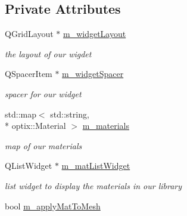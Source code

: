 \subsection*{Private Attributes}
\begin{DoxyCompactItemize}
\item 
\hypertarget{class_material_library_acc7cbee72728cb17b9dc46c6eb181235}{Q\-Grid\-Layout $\ast$ \hyperlink{class_material_library_acc7cbee72728cb17b9dc46c6eb181235}{m\-\_\-widget\-Layout}}\label{class_material_library_acc7cbee72728cb17b9dc46c6eb181235}

\begin{DoxyCompactList}\small\item\em the layout of our wigdet \end{DoxyCompactList}\item 
\hypertarget{class_material_library_a68a1b4d7a9cae065772845db125fee27}{Q\-Spacer\-Item $\ast$ \hyperlink{class_material_library_a68a1b4d7a9cae065772845db125fee27}{m\-\_\-widget\-Spacer}}\label{class_material_library_a68a1b4d7a9cae065772845db125fee27}

\begin{DoxyCompactList}\small\item\em spacer for our widget \end{DoxyCompactList}\item 
\hypertarget{class_material_library_af25abb43cda644364bc7faefbd957f9d}{std\-::map$<$ std\-::string, \\*
optix\-::\-Material $>$ \hyperlink{class_material_library_af25abb43cda644364bc7faefbd957f9d}{m\-\_\-materials}}\label{class_material_library_af25abb43cda644364bc7faefbd957f9d}

\begin{DoxyCompactList}\small\item\em map of our materials \end{DoxyCompactList}\item 
\hypertarget{class_material_library_a6a4c3021bf23b7048bbb5ef82c66d9dd}{Q\-List\-Widget $\ast$ \hyperlink{class_material_library_a6a4c3021bf23b7048bbb5ef82c66d9dd}{m\-\_\-mat\-List\-Widget}}\label{class_material_library_a6a4c3021bf23b7048bbb5ef82c66d9dd}

\begin{DoxyCompactList}\small\item\em list widget to display the materials in our library \end{DoxyCompactList}\item 
\hypertarget{class_material_library_ab1dded7ae6d88f5407e29af6f68caf4a}{bool \hyperlink{class_material_library_ab1dded7ae6d88f5407e29af6f68caf4a}{m\-\_\-apply\-Mat\-To\-Mesh}}\label{class_material_library_ab1dded7ae6d88f5407e29af6f68caf4a}


\end{DoxyCompactItemize}

